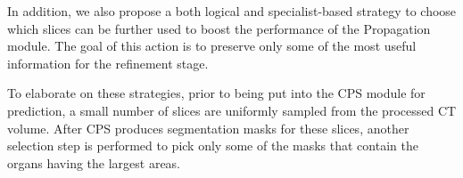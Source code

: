 
In addition, we also propose a both logical and specialist-based strategy to choose which slices can be further used to boost the performance of the Propagation module. The goal of this action is to preserve only some of the most useful information for the refinement stage.

To elaborate on these strategies, prior to being put into the CPS module for prediction, a small number of slices are uniformly sampled from the processed CT volume. After CPS produces segmentation masks for these slices, another selection step is performed to pick only some of the masks that contain the organs having the largest areas.  